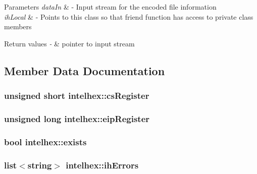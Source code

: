 \begin{DoxyParams}{Parameters}
{\em data\-In} & -\/ Input stream for the encoded file information \\
\hline
{\em ih\-Local} & -\/ Points to this class so that friend function has access to private class members\\
\hline
\end{DoxyParams}

\begin{DoxyRetVals}{Return values}
{\em -\/} & pointer to input stream \\
\hline
\end{DoxyRetVals}


\subsection{Member Data Documentation}
\hypertarget{classintelhex_aabbf5689bc667734dca7f23a11d3df68}{
\subsubsection[{cs\-Register}]{\setlength{\rightskip}{0pt plus 5cm}unsigned short intelhex\-::cs\-Register}}\label{classintelhex_aabbf5689bc667734dca7f23a11d3df68}
\hypertarget{classintelhex_abedd6ca388d3cad1d2525abc5939d27e}{
\subsubsection[{eip\-Register}]{\setlength{\rightskip}{0pt plus 5cm}unsigned long intelhex\-::eip\-Register}}\label{classintelhex_abedd6ca388d3cad1d2525abc5939d27e}
\hypertarget{classintelhex_ab58b4357deef8e4f0af9817393fc0b6e}{
\subsubsection[{exists}]{\setlength{\rightskip}{0pt plus 5cm}bool intelhex\-::exists}}\label{classintelhex_ab58b4357deef8e4f0af9817393fc0b6e}
\hypertarget{classintelhex_a76fb4550b43dfbb08018cabf34298400}{
\subsubsection[{ih\-Errors}]{\setlength{\rightskip}{0pt plus 5cm}list$<$string$>$ intelhex\-::ih\-Errors}}\label{classintelhex_a76fb4550b43dfbb08018cabf34298400}
